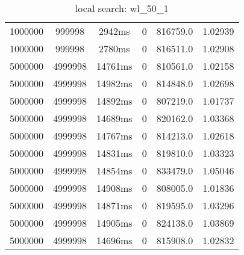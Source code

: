 \documentclass[./main.tex]{subfiles}
\begin{document}
\begin{table}
\begin{tabular}{ c | c | c | c | c | c }
        1000000 & 999998 & 2942ms & 0 & 816759.0 & 1.02939 \\
        1000000 & 999998 & 2780ms & 0 & 816511.0 & 1.02908 \\
        \hline
        5000000 & 4999998 & 14761ms & 0 & 810561.0 & 1.02158 \\
        5000000 & 4999998 & 14982ms & 0 & 814848.0 & 1.02698 \\
        5000000 & 4999998 & 14892ms & 0 & 807219.0 & 1.01737 \\
        5000000 & 4999998 & 14689ms & 0 & 820162.0 & 1.03368 \\
        5000000 & 4999998 & 14767ms & 0 & 814213.0 & 1.02618 \\
        5000000 & 4999998 & 14831ms & 0 & 819810.0 & 1.03323 \\
        5000000 & 4999998 & 14854ms & 0 & 833479.0 & 1.05046 \\
        5000000 & 4999998 & 14908ms & 0 & 808005.0 & 1.01836 \\
        5000000 & 4999998 & 14871ms & 0 & 819595.0 & 1.03296 \\
        5000000 & 4999998 & 14905ms & 0 & 824138.0 & 1.03869 \\
        \rowcolor{lightgray} 5000000 & 4999998 & 14696ms & 0 & 815908.0 & 1.02832 \\
    \end{tabular}
    \caption{local search: wl\_50\_1}
\end{table}
\end{document}

